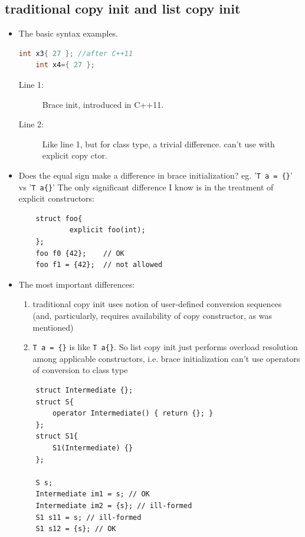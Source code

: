 \documentclass[a4paper,11pt,twoside]{book}
\begin{document}
\subsection{traditional copy init and list copy init}
\begin{itemize}
	\item The basic syntax examples. 
\begin{lstlisting}[frame=single, language=c++,mathescape=true]
	int x3{ 27 }; //after C++11
	int x4={ 27 }; 
\end{lstlisting}
	\begin{description}
		\item[Line 1:] Brace init, introduced in C++11.
		\item[Line 2:] Like line 1, but for class type, a trivial difference. can't use with explicit copy ctor.
	\end{description}

	\item Does the equal sign make a difference in brace initialization? eg. '\texttt{T a = \{\}}' vs '\texttt{T a\{\}}' The only significant difference I know is in the treatment of explicit constructors:
	
\begin{lstlisting}
	struct foo{
			explicit foo(int);
	};
	foo f0 {42};    // OK
	foo f1 = {42};  // not allowed
\end{lstlisting}

	
	\item The most important differences:
	\begin{enumerate}
		\item traditional copy init uses notion of user-defined conversion sequences (and, particularly, requires availability of copy constructor, as was mentioned)
		
		\item \texttt{T a = \{\}} is like \texttt{T a\{\}}. So list copy init just performs overload resolution among applicable constructors, i.e. brace initialization can't use operators of conversion to class type
	\end{enumerate}
\begin{lstlisting}
	struct Intermediate {};
	struct S{
		operator Intermediate() { return {}; }
	};
	struct S1{
		S1(Intermediate) {}
	};
		
	S s;
	Intermediate im1 = s; // OK
	Intermediate im2 = {s}; // ill-formed
	S1 s11 = s; // ill-formed
	S1 s12 = {s}; // OK
\end{lstlisting}
	

\end{itemize}
\end{document}
